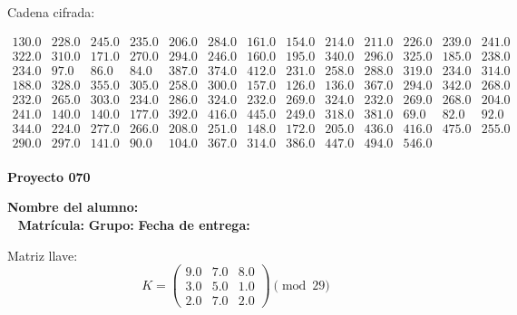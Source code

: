 \documentclass[12pt]{article}
\begin{document}
Cadena cifrada:
\begin{center}
$\begin{array}{lllllllllllll}
130.0 & 228.0 & 245.0 & 235.0 & 206.0 & 284.0 & 161.0 & 154.0 & 214.0 & 211.0 & 226.0 & 239.0 & 241.0\\
322.0 & 310.0 & 171.0 & 270.0 & 294.0 & 246.0 & 160.0 & 195.0 & 340.0 & 296.0 & 325.0 & 185.0 & 238.0\\
234.0 & 97.0 & 86.0 & 84.0 & 387.0 & 374.0 & 412.0 & 231.0 & 258.0 & 288.0 & 319.0 & 234.0 & 314.0\\
188.0 & 328.0 & 355.0 & 305.0 & 258.0 & 300.0 & 157.0 & 126.0 & 136.0 & 367.0 & 294.0 & 342.0 & 268.0\\
232.0 & 265.0 & 303.0 & 234.0 & 286.0 & 324.0 & 232.0 & 269.0 & 324.0 & 232.0 & 269.0 & 268.0 & 204.0\\
241.0 & 140.0 & 140.0 & 177.0 & 392.0 & 416.0 & 445.0 & 249.0 & 318.0 & 381.0 & 69.0 & 82.0 & 92.0\\
344.0 & 224.0 & 277.0 & 266.0 & 208.0 & 251.0 & 148.0 & 172.0 & 205.0 & 436.0 & 416.0 & 475.0 & 255.0\\
290.0 & 297.0 & 141.0 & 90.0 & 104.0 & 367.0 & 314.0 & 386.0 & 447.0 & 494.0 & 546.0\\
\end{array}$
\end{center}

\newpage


\textbf{Proyecto 070}

\textbf{Nombre del alumno:} \underline{\hspace{13cm}}\\\
\vspace{1cm}
\textbf{Matrícula:} \underline{\hspace{4cm}} \hspace{1cm}
\textbf{Grupo:} \underline{\hspace{2cm}}
\textbf{Fecha de entrega:} \underline{\hspace{2cm}}

\medskip

Matriz llave:
\[
K = \begin{pmatrix}
9.0 & 7.0 & 8.0\\
3.0 & 5.0 & 1.0\\
2.0 & 7.0 & 2.0
\end{pmatrix} \pmod{29}
\]
\end{document}
